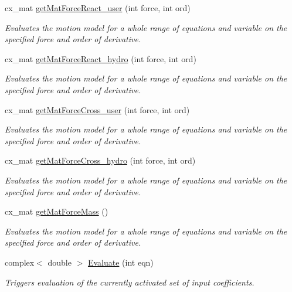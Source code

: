 \begin{DoxyCompactItemize}
cx\-\_\-mat \hyperlink{class_motion_model_a44e885c0255e74d82664c785499138f0}{get\-Mat\-Force\-React\-\_\-user} (int force, int ord)
\begin{DoxyCompactList}\small\item\em Evaluates the motion model for a whole range of equations and variable on the specified force and order of derivative. \end{DoxyCompactList}\item 
cx\-\_\-mat \hyperlink{class_motion_model_af239389973af6d198a21ee0c07db19c6}{get\-Mat\-Force\-React\-\_\-hydro} (int force, int ord)
\begin{DoxyCompactList}\small\item\em Evaluates the motion model for a whole range of equations and variable on the specified force and order of derivative. \end{DoxyCompactList}\item 
cx\-\_\-mat \hyperlink{class_motion_model_addbd875f2fc266823f645fc7f2d207e8}{get\-Mat\-Force\-Cross\-\_\-user} (int force, int ord)
\begin{DoxyCompactList}\small\item\em Evaluates the motion model for a whole range of equations and variable on the specified force and order of derivative. \end{DoxyCompactList}\item 
cx\-\_\-mat \hyperlink{class_motion_model_a7d661c296c3fe5c97322a62cceabb5d4}{get\-Mat\-Force\-Cross\-\_\-hydro} (int force, int ord)
\begin{DoxyCompactList}\small\item\em Evaluates the motion model for a whole range of equations and variable on the specified force and order of derivative. \end{DoxyCompactList}\item 
cx\-\_\-mat \hyperlink{class_motion_model_a7215db9f6f0c3e79f4559a4b9eadbcfc}{get\-Mat\-Force\-Mass} ()
\begin{DoxyCompactList}\small\item\em Evaluates the motion model for a whole range of equations and variable on the specified force and order of derivative. \end{DoxyCompactList}\item 
complex$<$ double $>$ \hyperlink{class_motion_model_a331d96a45df8ca0911fc4610705c3a30}{Evaluate} (int eqn)
\begin{DoxyCompactList}\small\item\em Triggers evaluation of the currently activated set of input coefficients. \end{DoxyCompactList}\item 

\end{DoxyCompactItemize}
